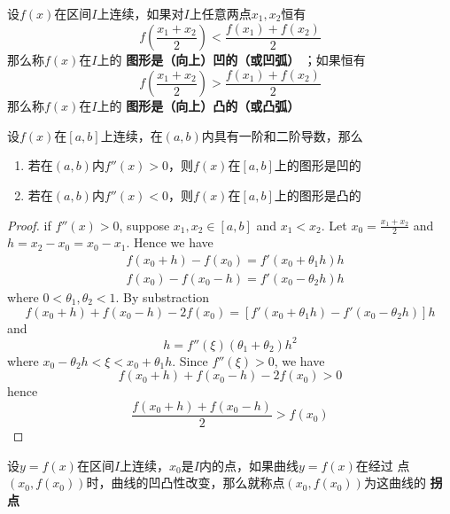 \documentclass[11pt]{article}
\begin{document}
\begin{definition}[]
设\(f(x)\)在区间\(I\)上连续，如果对\(I\)上任意两点\(x_1,x_2\)恒有
\begin{equation*}
f(\frac{x_1+x_2}{2})<\frac{f(x_1)+f(x_2)}{2}
\end{equation*}
那么称\(f(x)\)在\(I\)上的 \textbf{图形是（向上）凹的（或凹弧）} ；如果恒有
\begin{equation*}
f(\frac{x_1+x_2}{2})>\frac{f(x_1)+f(x_2)}{2}
\end{equation*}
那么称\(f(x)\)在\(I\)上的 \textbf{图形是（向上）凸的（或凸弧）}
\end{definition}

\begin{theorem}[]
设\(f(x)\)在\([a,b]\)上连续，在\((a,b)\)内具有一阶和二阶导数，那么
\begin{enumerate}
\item 若在\((a,b)\)内\(f''(x)>0\)，则\(f(x)\)在\([a,b]\)上的图形是凹的
\item 若在\((a,b)\)内\(f''(x)<0\)，则\(f(x)\)在\([a,b]\)上的图形是凸的
\end{enumerate}
\end{theorem}

\begin{proof}
if \(f''(x)>0\), suppose \(x_1,x_2\in[a,b]\) and \(x_1<x_2\). Let
\(x_0=\frac{x_1+x_2}{2}\) and \(h=x_2-x_0=x_0-x_1\). Hence we have
\begin{align*}
&f(x_0+h)-f(x_0)=f'(x_0+\theta_1 h)h\\
&f(x_0)-f(x_0-h)=f'(x_0-\theta_2h)h
\end{align*}
where \(0<\theta_1,\theta_2<1\). By substraction
\begin{equation*}
f(x_0+h)+f(x_0-h)-2f(x_0)=[f'(x_0+\theta_1h)-f'(x_0-\theta_2h)]h
\end{equation*}
and
\begin{equation*}
[f'(x_0+theta_1h)-f'(x_0-\theta_2h)]h=f''(\xi)(\theta_1+\theta_2)h^2
\end{equation*}
where \(x_0-\theta_2h<\xi<x_0+\theta_1h\). Since \(f''(\xi)>0\), we have
\begin{equation*}
f(x_0+h)+f(x_0-h)-2f(x_0)>0
\end{equation*}
hence
\begin{equation*}
\frac{f(x_0+h)+f(x_0-h)}{2}>f(x_0)
\end{equation*}
\end{proof}


设\(y=f(x)\)在区间\(I\)上连续，\(x_0\)是\(I\)内的点，如果曲线\(y=f(x)\)在经过
点\((x_0,f(x_0))\)时，曲线的凹凸性改变，那么就称点\((x_0,f(x_0))\)为这曲线的
\textbf{拐点}
\end{document}
